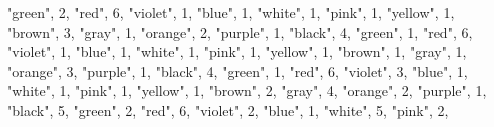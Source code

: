 \documentclass[
]{article}
\newenvironment{Shaded}{\begin{snugshade}}{\end{snugshade}}
\newcommand{\DecValTok}[1]{\textcolor[rgb]{0.00,0.00,0.81}{#1}}
\newcommand{\NormalTok}[1]{#1}
\newcommand{\StringTok}[1]{\textcolor[rgb]{0.31,0.60,0.02}{#1}}
\begin{document}
\begin{Shaded}
\begin{Highlighting}[]
  \StringTok{"green"}\NormalTok{, }\DecValTok{2}\NormalTok{,}
  \StringTok{"red"}\NormalTok{, }\DecValTok{6}\NormalTok{,}
  \StringTok{"violet"}\NormalTok{, }\DecValTok{1}\NormalTok{,}
  \StringTok{"blue"}\NormalTok{, }\DecValTok{1}\NormalTok{,}
  \StringTok{"white"}\NormalTok{, }\DecValTok{1}\NormalTok{,}
  \StringTok{"pink"}\NormalTok{, }\DecValTok{1}\NormalTok{,}
  \StringTok{"yellow"}\NormalTok{, }\DecValTok{1}\NormalTok{,}
  \StringTok{"brown"}\NormalTok{, }\DecValTok{3}\NormalTok{,}
  \StringTok{"gray"}\NormalTok{, }\DecValTok{1}\NormalTok{,}
  \StringTok{"orange"}\NormalTok{, }\DecValTok{2}\NormalTok{,}
  \StringTok{"purple"}\NormalTok{, }\DecValTok{1}\NormalTok{,}
    \StringTok{"black"}\NormalTok{, }\DecValTok{4}\NormalTok{,}
  \StringTok{"green"}\NormalTok{, }\DecValTok{1}\NormalTok{,}
  \StringTok{"red"}\NormalTok{, }\DecValTok{6}\NormalTok{,}
  \StringTok{"violet"}\NormalTok{, }\DecValTok{1}\NormalTok{, }
  \StringTok{"blue"}\NormalTok{, }\DecValTok{1}\NormalTok{, }
  \StringTok{"white"}\NormalTok{, }\DecValTok{1}\NormalTok{,}
  \StringTok{"pink"}\NormalTok{, }\DecValTok{1}\NormalTok{,}
  \StringTok{"yellow"}\NormalTok{, }\DecValTok{1}\NormalTok{,}
  \StringTok{"brown"}\NormalTok{, }\DecValTok{1}\NormalTok{,}
  \StringTok{"gray"}\NormalTok{, }\DecValTok{1}\NormalTok{,}
  \StringTok{"orange"}\NormalTok{, }\DecValTok{3}\NormalTok{,}
  \StringTok{"purple"}\NormalTok{, }\DecValTok{1}\NormalTok{,}
    \StringTok{"black"}\NormalTok{, }\DecValTok{4}\NormalTok{,}
  \StringTok{"green"}\NormalTok{, }\DecValTok{1}\NormalTok{,}
  \StringTok{"red"}\NormalTok{, }\DecValTok{6}\NormalTok{,}
  \StringTok{"violet"}\NormalTok{, }\DecValTok{3}\NormalTok{,}
  \StringTok{"blue"}\NormalTok{, }\DecValTok{1}\NormalTok{,}
  \StringTok{"white"}\NormalTok{, }\DecValTok{1}\NormalTok{,}
  \StringTok{"pink"}\NormalTok{, }\DecValTok{1}\NormalTok{,}
  \StringTok{"yellow"}\NormalTok{, }\DecValTok{1}\NormalTok{,}
  \StringTok{"brown"}\NormalTok{, }\DecValTok{2}\NormalTok{,}
  \StringTok{"gray"}\NormalTok{, }\DecValTok{4}\NormalTok{,}
  \StringTok{"orange"}\NormalTok{, }\DecValTok{2}\NormalTok{,}
  \StringTok{"purple"}\NormalTok{, }\DecValTok{1}\NormalTok{,}
    \StringTok{"black"}\NormalTok{, }\DecValTok{5}\NormalTok{,}
  \StringTok{"green"}\NormalTok{, }\DecValTok{2}\NormalTok{,}
  \StringTok{"red"}\NormalTok{, }\DecValTok{6}\NormalTok{,}
  \StringTok{"violet"}\NormalTok{, }\DecValTok{2}\NormalTok{,}
  \StringTok{"blue"}\NormalTok{, }\DecValTok{1}\NormalTok{,}
  \StringTok{"white"}\NormalTok{, }\DecValTok{5}\NormalTok{,}
  \StringTok{"pink"}\NormalTok{, }\DecValTok{2}\NormalTok{,}

\end{Highlighting}
\end{Shaded}
\end{document}

